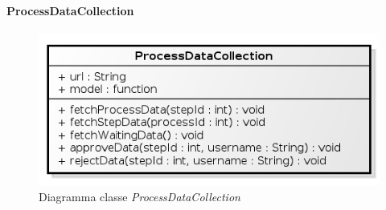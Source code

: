 \paragraph{ProcessDataCollection}
\label{processDataCollection}

\begin{figure}[H] \centering \includegraphics[width=%
\textwidth]
{./classi/client/model/ProcessDataCollection.png} \caption{Diagramma classe  \textit{ProcessDataCollection}}
\end{figure}

